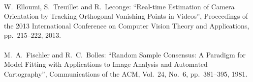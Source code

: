 \begin{mythebibliography}{}
\leavevmode \\W.~Elloumi, S.~Treuillet and R.~Leconge:
\newblock ``Real-time Estimation of Camera Orientation by Tracking Orthogonal Vanishing Points in Videos'',
\newblock Proceedings of the 2013 International Conference on Computer Vision Theory and Applications, pp.~215--222, 2013.
\\





\leavevmode \\M.~A.~Fischler and R.~C.~Bolles:
\newblock ``Random Sample Consensus: A Paradigm for Model Fitting with Applications to Image Analysis and Automated Cartography'',
\newblock Communications of the ACM, Vol.~24, No.~6, pp.~381--395, 1981.
\\




\end{mythebibliography}
